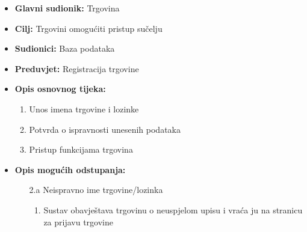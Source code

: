                         \noindent {}
					\begin{itemize}
	
						\item \textbf{Glavni sudionik: }Trgovina
						\item  \textbf{Cilj:}  Trgovini omogućiti pristup sučelju
						\item  \textbf{Sudionici:} Baza podataka
						\item  \textbf{Preduvjet:} Registracija trgovine
						\item  \textbf{Opis osnovnog tijeka:}
						
						\item[] \begin{enumerate}
							\item Unos imena trgovine i lozinke
                                \item Potvrda o ispravnosti unesenih podataka
                                \item Pristup funkcijama trgovina
						\end{enumerate}

                            \item  \textbf{Opis mogućih odstupanja:}
						
						\item[] \begin{enumerate}
	
							\item[2.a] Neispravno ime trgovine/lozinka
							\item[] \begin{enumerate}
								
								\item Sustav obavještava trgovinu o neuspjelom upisu i vraća ju na stranicu za prijavu trgovine\\
								
							\end{enumerate}
			
							
						\end{enumerate}
						
					\end{itemize}

